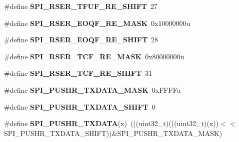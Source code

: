 \begin{DoxyCompactItemize}
\item 
\#define {\bfseries S\+P\+I\+\_\+\+R\+S\+E\+R\+\_\+\+T\+F\+U\+F\+\_\+\+R\+E\+\_\+\+S\+H\+I\+FT}~27\hypertarget{group__SPI__Register__Masks_ga42ef57e6e872c54f15ba9742f98ea522}{}\label{group__SPI__Register__Masks_ga42ef57e6e872c54f15ba9742f98ea522}

\item 
\#define {\bfseries S\+P\+I\+\_\+\+R\+S\+E\+R\+\_\+\+E\+O\+Q\+F\+\_\+\+R\+E\+\_\+\+M\+A\+SK}~0x10000000u\hypertarget{group__SPI__Register__Masks_ga41b148811704b6e9903262dbd1d72433}{}\label{group__SPI__Register__Masks_ga41b148811704b6e9903262dbd1d72433}

\item 
\#define {\bfseries S\+P\+I\+\_\+\+R\+S\+E\+R\+\_\+\+E\+O\+Q\+F\+\_\+\+R\+E\+\_\+\+S\+H\+I\+FT}~28\hypertarget{group__SPI__Register__Masks_ga93b9a7fbf5962c0e407879c781779ac4}{}\label{group__SPI__Register__Masks_ga93b9a7fbf5962c0e407879c781779ac4}

\item 
\#define {\bfseries S\+P\+I\+\_\+\+R\+S\+E\+R\+\_\+\+T\+C\+F\+\_\+\+R\+E\+\_\+\+M\+A\+SK}~0x80000000u\hypertarget{group__SPI__Register__Masks_ga51ba97f1d47ebd36d19c5a634ce96873}{}\label{group__SPI__Register__Masks_ga51ba97f1d47ebd36d19c5a634ce96873}

\item 
\#define {\bfseries S\+P\+I\+\_\+\+R\+S\+E\+R\+\_\+\+T\+C\+F\+\_\+\+R\+E\+\_\+\+S\+H\+I\+FT}~31\hypertarget{group__SPI__Register__Masks_ga51740ce9a6d3a38cf50cb1f19af3d002}{}\label{group__SPI__Register__Masks_ga51740ce9a6d3a38cf50cb1f19af3d002}

\item 
\#define {\bfseries S\+P\+I\+\_\+\+P\+U\+S\+H\+R\+\_\+\+T\+X\+D\+A\+T\+A\+\_\+\+M\+A\+SK}~0x\+F\+F\+F\+Fu\hypertarget{group__SPI__Register__Masks_gac3651a6adad71c41138f88336e7711b4}{}\label{group__SPI__Register__Masks_gac3651a6adad71c41138f88336e7711b4}

\item 
\#define {\bfseries S\+P\+I\+\_\+\+P\+U\+S\+H\+R\+\_\+\+T\+X\+D\+A\+T\+A\+\_\+\+S\+H\+I\+FT}~0\hypertarget{group__SPI__Register__Masks_gac9778e35b8039b1268b42e16066a7812}{}\label{group__SPI__Register__Masks_gac9778e35b8039b1268b42e16066a7812}

\item 
\#define {\bfseries S\+P\+I\+\_\+\+P\+U\+S\+H\+R\+\_\+\+T\+X\+D\+A\+TA}(x)~(((uint32\+\_\+t)(((uint32\+\_\+t)(x))$<$$<$S\+P\+I\+\_\+\+P\+U\+S\+H\+R\+\_\+\+T\+X\+D\+A\+T\+A\+\_\+\+S\+H\+I\+FT))\&S\+P\+I\+\_\+\+P\+U\+S\+H\+R\+\_\+\+T\+X\+D\+A\+T\+A\+\_\+\+M\+A\+SK)\hypertarget{group__SPI__Register__Masks_gad19c7faf45531d7c7a6703a54ac2f69d}{}\label{group__SPI__Register__Masks_gad19c7faf45531d7c7a6703a54ac2f69d}


\end{DoxyCompactItemize}

